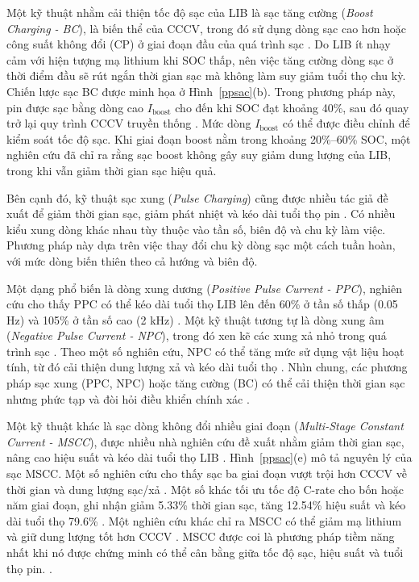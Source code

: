 \documentclass{thesis}
\begin{document}
 Một kỹ thuật nhằm cải thiện tốc độ sạc của LIB là sạc tăng cường (\textit{Boost Charging - BC}), là biến thể của CCCV, trong đó sử dụng dòng sạc cao hơn hoặc công suất không đổi (CP) ở giai đoạn đầu của quá trình sạc \cite{ref34}. Do LIB ít nhạy cảm với hiện tượng mạ lithium khi SOC thấp, nên việc tăng cường dòng sạc ở thời điểm đầu sẽ rút ngắn thời gian sạc mà không làm suy giảm tuổi thọ chu kỳ. Chiến lược sạc BC được minh họa ở Hình~\ref{ppsac}(b). Trong phương pháp này, pin được sạc bằng dòng cao $I_\mathrm{boost}$ cho đến khi SOC đạt khoảng 40\%, sau đó quay trở lại quy trình CCCV truyền thống \cite{ref34}. Mức dòng $I_\mathrm{boost}$ có thể được điều chỉnh để kiểm soát tốc độ sạc. Khi giai đoạn boost nằm trong khoảng 20\%–60\% SOC, một nghiên cứu đã chỉ ra rằng sạc boost không gây suy giảm dung lượng của LIB, trong khi vẫn giảm thời gian sạc hiệu quả. 
 
Bên cạnh đó, kỹ thuật sạc xung (\textit{Pulse Charging}) cũng được nhiều tác giả đề xuất để giảm thời gian sạc, giảm phát nhiệt và kéo dài tuổi thọ pin \cite{ref35, ref36}. Có nhiều kiểu xung dòng khác nhau tùy thuộc vào tần số, biên độ và chu kỳ làm việc. Phương pháp này dựa trên việc thay đổi chu kỳ dòng sạc một cách tuần hoàn, với mức dòng biến thiên theo cả hướng và biên độ.

Một dạng phổ biến là dòng xung dương (\textit{Positive Pulse Current - PPC}), nghiên cứu cho thấy PPC có thể kéo dài tuổi thọ LIB lên đến 60\% ở tần số thấp (0.05 Hz) và 105\% ở tần số cao (2 kHz) \cite{ref36}. 
 Một kỹ thuật tương tự là dòng xung âm (\textit{Negative Pulse Current - NPC}), trong đó xen kẽ các xung xả nhỏ trong quá trình sạc \cite{ref37, ref38}. Theo một số nghiên cứu, NPC có thể tăng mức sử dụng vật liệu hoạt tính, từ đó cải thiện dung lượng xả và kéo dài tuổi thọ \cite{ref38}.
Nhìn chung, các phương pháp sạc xung (PPC, NPC) hoặc tăng cường (BC) có thể cải thiện thời gian sạc nhưng phức tạp và đòi hỏi điều khiển chính xác \cite{ref36, ref38}.

 Một kỹ thuật khác là sạc dòng không đổi nhiều giai đoạn (\textit{Multi-Stage Constant Current - MSCC}), được nhiều nhà nghiên cứu đề xuất nhằm giảm thời gian sạc, nâng cao hiệu suất và kéo dài tuổi thọ LIB \cite{ref39, ref29}. Hình~\ref{ppsac}(e) mô tả nguyên lý của sạc MSCC. Một số nghiên cứu cho thấy sạc ba giai đoạn vượt trội hơn CCCV về thời gian và dung lượng sạc/xả \cite{ref29}. Một số khác tối ưu tốc độ C-rate cho bốn hoặc năm giai đoạn, ghi nhận giảm 5.33\% thời gian sạc, tăng 12.54\% hiệu suất và kéo dài tuổi thọ 79.6\% \cite{ref39}. Một nghiên cứu khác chỉ ra MSCC có thể giảm mạ lithium và giữ dung lượng tốt hơn CCCV \cite{ref19}. MSCC được coi là phương pháp tiềm năng nhất khi nó được chứng minh có thể cân bằng giữa tốc độ sạc, hiệu suất và tuổi thọ pin. \cite{ref29, ref39}. 
\end{document}
